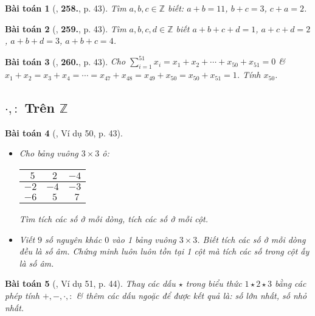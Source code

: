 \documentclass{article}
\numberwithin{equation}{section}
\newtheorem{baitoan}{Bài toán}
\begin{document}
\begin{baitoan}[\cite{Binh_Toan_6_tap_1}, \textbf{258.}, p. 43]
	Tìm $a,b,c\in\mathbb{Z}$ biết: $a + b = 11$, $b + c = 3$, $c + a = 2$.
\end{baitoan}

\begin{baitoan}[\cite{Binh_Toan_6_tap_1}, \textbf{259.}, p. 43]
	Tìm $a,b,c,d\in\mathbb{Z}$ biết $a + b + c + d = 1$, $a + c + d = 2$, $a + b + d = 3$, $a + b + c = 4$.
\end{baitoan}

\begin{baitoan}[\cite{Binh_Toan_6_tap_1}, \textbf{260.}, p. 43]
	Cho $\sum_{i=1}^{51} x_i = x_1 + x_2 + \cdots + x_{50} + x_{51} = 0$ \& $x_1 + x_2 = x_3 + x_4 = \cdots = x_{47} + x_{48} = x_{49} + x_{50} = x_{50} + x_{51} = 1$. Tính $x_{50}$.
\end{baitoan}


\subsection{$\cdot,:$ Trên $\mathbb{Z}$}

\begin{baitoan}[\cite{Binh_Toan_6_tap_1}, Ví dụ 50, p. 43]
	\begin{itemize}
		\item[(a)] Cho bảng vuông $3\times 3$ ô:
		\begin{table}[H]
			\centering
			\begin{tabular}{|c|c|c|}
				\hline
				$\ \ 5$ & $\ \ 2$ & $-4$ \\
				\hline
				$-2$ & $-4$ & $-3$ \\
				\hline
				$-6$ & $\ \ 5$ & $\ \ 7$ \\
				\hline
			\end{tabular}
		\end{table}
		Tìm tích các số ở mỗi dòng, tích các số ở mỗi cột.
		\item[(b)] Viết $9$ số nguyên khác $0$ vào 1 bảng vuông $3\times 3$. Biết tích các số ở mỗi dòng đều là số âm. Chứng minh luôn luôn tồn tại 1 cột mà tích các số trong cột ấy là số âm.
	\end{itemize}
\end{baitoan}

\begin{baitoan}[\cite{Binh_Toan_6_tap_1}, Ví dụ 51, p. 44]
	Thay các dấu $\star$ trong biểu thức $1\star2\star3$ bằng các phép tính $+,-,\cdot,:$ \& thêm các dấu ngoặc để được kết quả là: số lớn nhất, số nhỏ nhất.
\end{baitoan}
\end{document}
